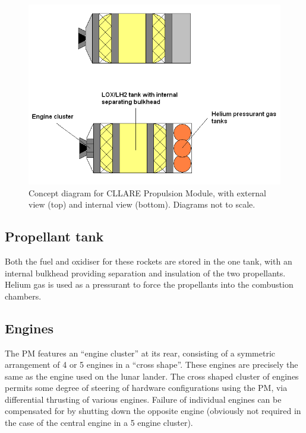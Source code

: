 \documentclass{report}
\begin{document}
\begin{figure}[h] \label{fig:pm}
\centering
\includegraphics[scale=0.6]{images/cllare_pm_concept}
\caption{Concept diagram for CLLARE Propulsion Module, with external view (top) and internal view (bottom).  Diagrams not to scale.}
\end{figure}

\subsection{Propellant tank}

Both the fuel and oxidiser for these rockets are stored in the one tank, with an internal bulkhead providing separation and insulation of the two propellants.  Helium gas is used as a pressurant to force the propellants into the combustion chambers.

\subsection{Engines}

The PM features an ``engine cluster'' at its rear, consisting of a symmetric arrangement of 4 or 5 engines in a ``cross shape''.  These engines are precisely the same as the engine used on the lunar lander.  The cross shaped cluster of engines permits some degree of steering of hardware configurations using the PM, via differential thrusting of various engines.  Failure of individual engines can be compensated for by shutting down the opposite engine (obviously not required in the case of the central engine in a 5 engine cluster).

\end{document}
